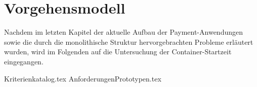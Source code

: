 \chapter{Vorgehensmodell}

Nachdem im letzten Kapitel der aktuelle Aufbau der Payment-Anwendungen sowie die durch die monolithische Struktur hervorgebrachten Probleme erläutert wurden, wird im Folgenden auf die Untersuchung der Container-Startzeit eingegangen.

{Kriterienkatalog.tex}
{AnforderungenPrototypen.tex}
